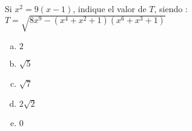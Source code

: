 \documentclass[12pt, a5paper]{article}
\begin{document}
\noindent Si $x^2 = 9(x - 1)$, indique el valor de $T$,  siendo : \\ $T = \sqrt{8x^9 - (x^4 + x^2 + 1)(x^6 + x^3 + 1)}$

\begin{enumerate}[a) ]
\item{$2$}
\item{$\sqrt{5}$}
\item{$\sqrt{7}$}
\item{$2\sqrt{2}$}
\item{$0$}
\end{enumerate}
\end{document}

